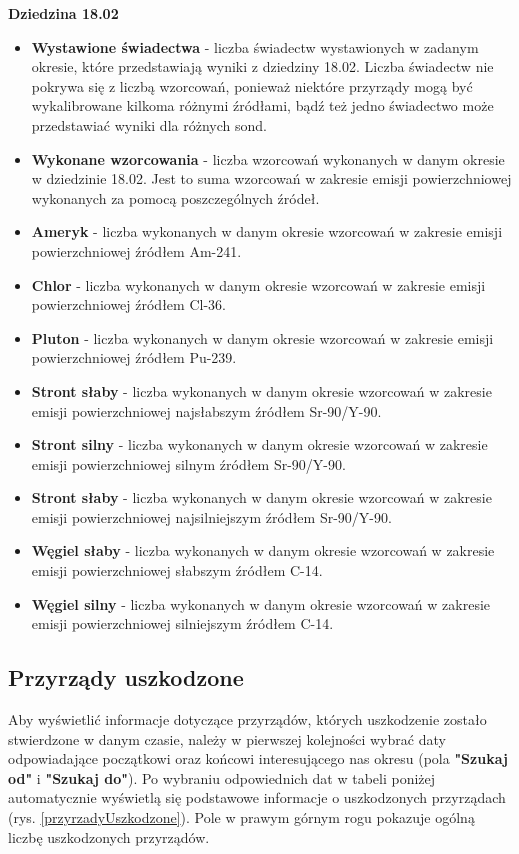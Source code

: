 \textbf{Dziedzina 18.02}
\begin{itemize}
	\item \textbf{Wystawione świadectwa} - liczba świadectw wystawionych w zadanym okresie, które przedstawiają wyniki z dziedziny 18.02. Liczba świadectw nie pokrywa się z liczbą wzorcowań, ponieważ niektóre przyrządy mogą być wykalibrowane kilkoma różnymi źródłami, bądź też jedno świadectwo może przedstawiać wyniki dla różnych sond.
	\item \textbf{Wykonane wzorcowania} - liczba wzorcowań wykonanych w danym okresie w dziedzinie 18.02. Jest to suma wzorcowań w zakresie emisji powierzchniowej wykonanych za pomocą poszczególnych źródeł.
	\item \textbf{Ameryk} - liczba wykonanych w danym okresie wzorcowań w zakresie emisji powierzchniowej źródłem Am-241.
	\item \textbf{Chlor} - liczba wykonanych w danym okresie wzorcowań w zakresie emisji powierzchniowej źródłem Cl-36.
	\item \textbf{Pluton} - liczba wykonanych w danym okresie wzorcowań w zakresie emisji powierzchniowej źródłem Pu-239.
	\item \textbf{Stront słaby} - liczba wykonanych w danym okresie wzorcowań w zakresie emisji powierzchniowej najsłabszym źródłem Sr-90/Y-90.
	\item \textbf{Stront silny} - liczba wykonanych w danym okresie wzorcowań w zakresie emisji powierzchniowej silnym źródłem Sr-90/Y-90.
	\item \textbf{Stront słaby} - liczba wykonanych w danym okresie wzorcowań w zakresie emisji powierzchniowej najsilniejszym źródłem Sr-90/Y-90.
	\item \textbf{Węgiel słaby} - liczba wykonanych w danym okresie wzorcowań w zakresie emisji powierzchniowej słabszym źródłem C-14.
	\item \textbf{Węgiel silny} - liczba wykonanych w danym okresie wzorcowań w zakresie emisji powierzchniowej silniejszym źródłem C-14.
\end{itemize}

\subsection{Przyrządy uszkodzone}
\label{uszkodzone}

Aby wyświetlić informacje dotyczące przyrządów, których uszkodzenie zostało stwierdzone w danym czasie, należy w pierwszej kolejności wybrać daty odpowiadające początkowi oraz końcowi interesującego nas okresu (pola \textbf{"Szukaj od"} i \textbf{"Szukaj do"}). Po wybraniu odpowiednich dat w tabeli poniżej automatycznie wyświetlą się podstawowe informacje o uszkodzonych przyrządach (rys. \ref{przyrzadyUszkodzone}).  Pole w prawym górnym rogu pokazuje ogólną liczbę uszkodzonych przyrządów.

